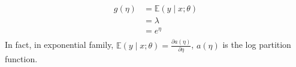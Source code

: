 \begin{answer}
    $$
        \begin{aligned}
            g(\eta) &= \mathbb{E}(y \mid x;\theta) \\
            &= \lambda \\
            &= e^{\eta} \\
        \end{aligned}
    $$
    In fact, in exponential family, $\mathbb{E}(y \mid x;\theta) = \frac{\partial a(\eta)}{\partial \eta}$, $a(\eta)$ is the log partition function.
\end{answer}
